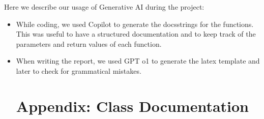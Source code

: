 \documentclass[11pt]{article}
\begin{document}
Here we describe our usage of Generative AI during the project: 
\begin{itemize}
    \item While coding, we used Copilot to generate the docsstrings for the functions. This was useful to have a structured documentation and to keep track of the parameters and return values of each function.
    \item When writing the report, we used GPT o1 to generate the latex template and later to check for grammatical mistakes. 

\newpage
\printbibliography

\appendix
\section{Appendix: Class Documentation}

\end{itemize}
\end{document}
